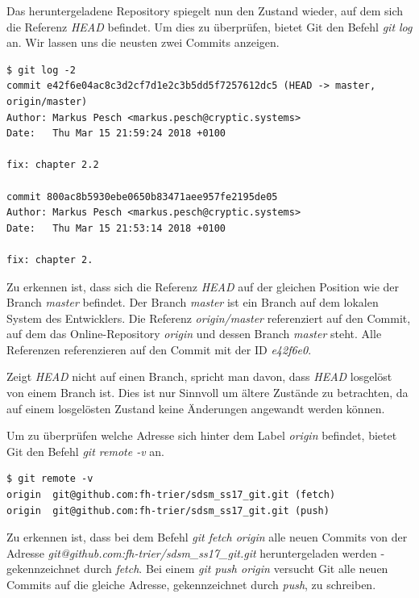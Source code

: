Das heruntergeladene Repository spiegelt nun den Zustand wieder, auf dem sich die Referenz \textit{HEAD} befindet. Um dies zu überprüfen, bietet Git den Befehl \textit{git log} an. Wir lassen uns die neusten zwei Commits anzeigen.

\begin{verbatim}
$ git log -2
commit e42f6e04ac8c3d2cf7d1e2c3b5dd5f7257612dc5 (HEAD -> master, origin/master)
Author: Markus Pesch <markus.pesch@cryptic.systems>
Date:   Thu Mar 15 21:59:24 2018 +0100

fix: chapter 2.2

commit 800ac8b5930ebe0650b83471aee957fe2195de05
Author: Markus Pesch <markus.pesch@cryptic.systems>
Date:   Thu Mar 15 21:53:14 2018 +0100

fix: chapter 2.
\end{verbatim}

Zu erkennen ist, dass sich die Referenz \textit{HEAD} auf der gleichen Position wie der Branch \textit{master} befindet. Der Branch \textit{master} ist ein Branch auf dem lokalen System des Entwicklers. Die Referenz \textit{origin/master} referenziert auf den Commit, auf dem das Online-Repository \textit{origin} und dessen Branch \textit{master} steht. Alle Referenzen referenzieren auf den Commit mit der ID \textit{e42f6e0}.

\begin{warn-popup}
  Zeigt \textit{HEAD} nicht auf einen Branch, spricht man davon, dass \textit{HEAD} losgelöst von einem Branch ist. Dies ist nur Sinnvoll um ältere Zustände zu betrachten, da auf einem losgelösten Zustand keine Änderungen angewandt werden können.
\end{warn-popup}

Um zu überprüfen welche Adresse sich hinter dem Label \textit{origin} befindet, bietet Git den Befehl \textit{git remote -v} an.

\begin{verbatim}
$ git remote -v
origin  git@github.com:fh-trier/sdsm_ss17_git.git (fetch)
origin  git@github.com:fh-trier/sdsm_ss17_git.git (push)
\end{verbatim}

Zu erkennen ist, dass bei dem Befehl \textit{git fetch origin} alle neuen Commits von der Adresse \textit{git@github.com:fh-trier/sdsm\_ss17\_git.git} heruntergeladen werden - gekennzeichnet durch \textit{fetch}. Bei einem \textit{git push origin} versucht Git alle neuen Commits auf die gleiche Adresse, gekennzeichnet durch \textit{push}, zu schreiben.

